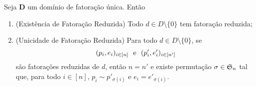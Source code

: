 \begin{proposition}
Seja $\bm D$ um domínio de fatoração única. Então
	\begin{enumerate}
	\item (Existência de Fatoração Reduzida) Todo $d \in D \setminus \{0\}$ tem fatoração reduzida;
	\item (Unicidade de Fatoração Reduzida) Para todo $d \in D \setminus \{0\}$, se
	\begin{equation*}
	(p_i,e_i)_{i \in [n]} \text{\ \ e\ \ } (p'_i,e'_i)_{i \in [n']}
	\end{equation*}
são fatorações reduzidas de $d$, então $n=n'$ e existe permutação $\sigma \in \mathfrak{S}_n$ tal que, para todo $i \in [n]$, $p_i \sim p'_{\sigma(i)}$ e $e_i=e'_{\sigma(i)}$.
	\end{enumerate}
\end{proposition}
